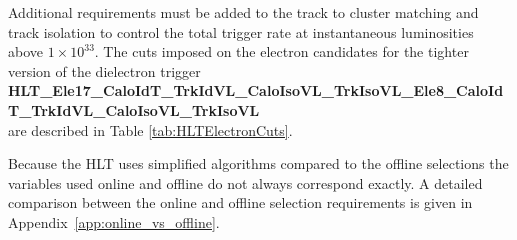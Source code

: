 Additional requirements must be added to the track to cluster matching 
and track isolation to control the total trigger rate at instantaneous luminosities above $1\times10^{33}$. 
The cuts imposed on the electron candidates for the tighter version of the dielectron trigger\\
{\bf HLT\_Ele17\_CaloIdT\_TrkIdVL\_CaloIsoVL\_TrkIsoVL\_Ele8\_CaloIdT\_TrkIdVL\_CaloIsoVL\_TrkIsoVL}\\
are described in Table \ref{tab:HLTElectronCuts}.

Because the HLT uses simplified algorithms compared to the offline selections
the variables used online and offline do not always correspond exactly.
A detailed comparison between the online and offline selection requirements is given in
Appendix~\ref{app:online_vs_offline}.

